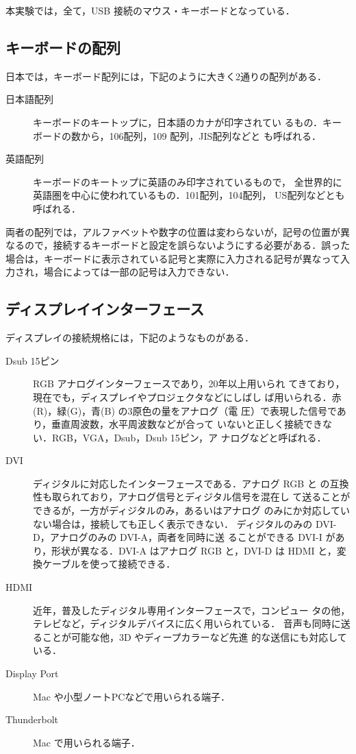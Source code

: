 本実験では，全て，USB 接続のマウス・キーボードとなっている．

\subsection{キーボードの配列}

日本では，キーボード配列には，下記のように大きく2通りの配列がある．

\begin{description}
 \item[日本語配列] キーボードのキートップに，日本語のカナが印字されてい
	    るもの．キーボードの数から，106配列，109 配列，JIS配列などと
	    も呼ばれる．
 \item[英語配列] キーボードのキートップに英語のみ印字されているもので，
	    全世界的に英語圏を中心に使われているもの．101配列，104配列，
	    US配列などとも呼ばれる．
\end{description}

両者の配列では，アルファベットや数字の位置は変わらないが，記号の位置が異
なるので，接続するキーボードと設定を誤らないようにする必要がある．誤った
場合は，キーボードに表示されている記号と実際に入力される記号が異なって入
力され，場合によっては一部の記号は入力できない．

\subsection{ディスプレイインターフェース}

ディスプレイの接続規格には，下記のようなものがある．

\begin{description}
 \item[Dsub 15ピン] RGB アナログインターフェースであり，20年以上用いられ
	    てきており，現在でも，ディスプレイやプロジェクタなどにしばし
	    ば用いられる．赤(R)，緑(G)，青(B) の3原色の量をアナログ（電
	    圧）で表現した信号であり，垂直周波数，水平周波数などが合って
	    いないと正しく接続できない．RGB，VGA，Dsub，Dsub 15ピン，ア
	    ナログなどと呼ばれる．
 \item[DVI] ディジタルに対応したインターフェースである．アナログ RGB と
	    の互換性も取られており，アナログ信号とディジタル信号を混在し
	    て送ることができるが，一方がディジタルのみ，あるいはアナログ
	    のみにか対応していない場合は，接続しても正しく表示できない．
	    ディジタルのみの DVI-D，アナログのみの DVI-A，両者を同時に送
	    ることができる DVI-I があり，形状が異なる．DVI-A はアナログ
	    RGB と，DVI-D は HDMI と，変換ケーブルを使って接続できる．
 \item[HDMI] 近年，普及したディジタル専用インターフェースで，コンピュー
	    タの他，テレビなど，ディジタルデバイスに広く用いられている．
	    音声も同時に送ることが可能な他，3D やディープカラーなど先進
	    的な送信にも対応している．
 \item[Display Port] Mac や小型ノートPCなどで用いられる端子．
 \item[Thunderbolt] Mac で用いられる端子．
\end{description}

